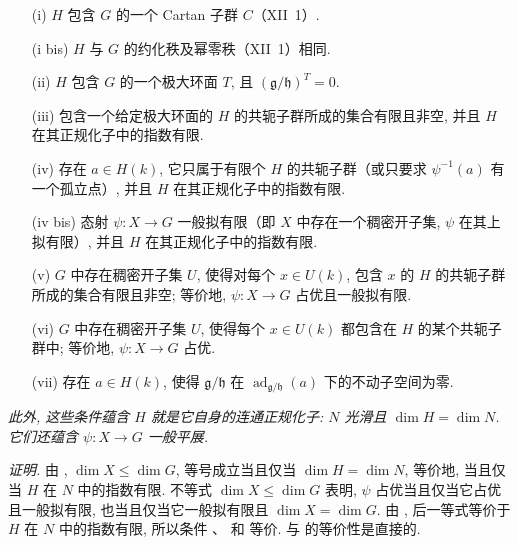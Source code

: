 \begin{enumerate}
\item[(i)] 
  \(H\) 包含 \(G\) 的一个 Cartan 子群 \(C\)（XII~1）.
\item[(i bis)] 
  \(H\) 与 \(G\) 的约化秩及幂零秩（XII~1）相同.
\item[(ii)] 
  \(H\) 包含 \(G\) 的一个极大环面 \(T\), 且 \((\mathfrak g/\mathfrak h)^T=0\).
\item[(iii)] 
  包含一个给定极大环面的 \(H\) 的共轭子群所成的集合有限且非空, 并且 \(H\) 在其正规化子中的指数有限.
\item[(iv)] 
  存在 \(a\in H(k)\), 它只属于有限个 \(H\) 的共轭子群（或只要求 \(\psi^{-1}(a)\) 有一个孤立点）, 并且 \(H\) 在其正规化子中的指数有限.
\item[(iv bis)] 
  态射 \(\psi:X\to G\) 一般拟有限（即 \(X\) 中存在一个稠密开子集, \(\psi\) 在其上拟有限）, 并且 \(H\) 在其正规化子中的指数有限.
\item[(v)] 
  \(G\) 中存在稠密开子集 \(U\), 使得对每个 \(x\in U(k)\), 包含 \(x\) 的 \(H\) 的共轭子群所成的集合有限且非空; 等价地, \(\psi:X\to G\) 占优且一般拟有限.
\item[(vi)] 
  \(G\) 中存在稠密开子集 \(U\), 使得每个 \(x\in U(k)\) 都包含在 \(H\) 的某个共轭子群中; 等价地, \(\psi:X\to G\) 占优.
\item[(vii)] 
  存在 \(a\in H(k)\), 使得 \(\mathfrak g/\mathfrak h\) 在 \(\operatorname{ad}_{\mathfrak g/\mathfrak h}(a)\) 下的不动子空间为零.
\end{enumerate}

\textit{此外, 这些条件蕴含 \(H\) 就是它自身的连通正规化子: \(N\) 光滑且 \(\dim H=\dim N\). 它们还蕴含 \(\psi:X\to G\) 一般平展.}

\noindent\textit{证明.}
由 , \(\dim X\leq\dim G\), 等号成立当且仅当 \(\dim H=\dim N\), 等价地, 当且仅当 \(H\) 在 \(N\) 中的指数有限. 不等式 \(\dim X\leq\dim G\) 表明, \(\psi\) 占优当且仅当它占优且一般拟有限, 也当且仅当它一般拟有限且 \(\dim X=\dim G\). 由 , 后一等式等价于 \(H\) 在 \(N\) 中的指数有限, 所以条件 、 和  等价.  与  的等价性是直接的.

